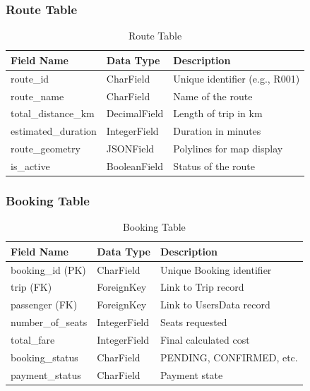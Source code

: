 \subsubsection{Route Table}
\begin{table}[H]
\centering
\caption{Route Table}
\renewcommand{\arraystretch}{1.5}
\begin{tabular}{|p{3cm}|p{3.5cm}|p{7cm}|}
\hline
\textbf{Field Name} & \textbf{Data Type} & \textbf{Description} \\
\hline
route\_id & CharField & Unique identifier (e.g., R001) \\
\hline
route\_name & CharField & Name of the route \\
\hline
total\_distance\_km & DecimalField & Length of trip in km \\
\hline
estimated\_duration & IntegerField & Duration in minutes \\
\hline
route\_geometry & JSONField & Polylines for map display \\
\hline
is\_active & BooleanField & Status of the route \\
\hline
\end{tabular}
\end{table}

\subsubsection{Booking Table}
\begin{table}[H]
\centering
\caption{Booking Table}
\renewcommand{\arraystretch}{1.5}
\begin{tabular}{|p{3cm}|p{3.5cm}|p{7cm}|}
\hline
\textbf{Field Name} & \textbf{Data Type} & \textbf{Description} \\
\hline
booking\_id (PK) & CharField & Unique Booking identifier \\
\hline
trip (FK) & ForeignKey & Link to Trip record \\
\hline
passenger (FK) & ForeignKey & Link to UsersData record \\
\hline
number\_of\_seats & IntegerField & Seats requested \\
\hline
total\_fare & IntegerField & Final calculated cost \\
\hline
booking\_status & CharField & PENDING, CONFIRMED, etc. \\
\hline
payment\_status & CharField & Payment state \\
\hline
\end{tabular}
\end{table}

